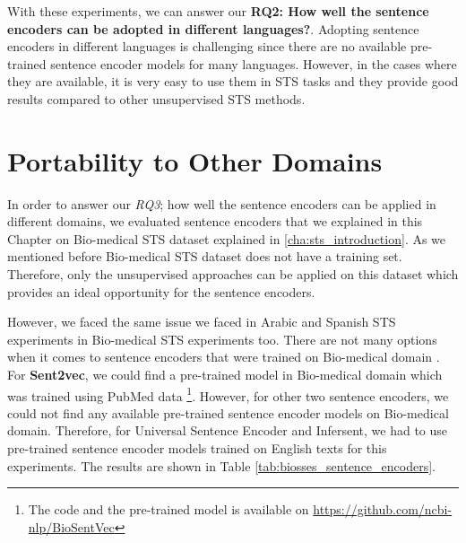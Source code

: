 With these experiments, we can answer our \textbf{RQ2: How well the sentence encoders can be adopted in different languages?}. Adopting sentence encoders in different languages is challenging since there are no available pre-trained sentence encoder models for many languages. However, in the cases where they are available, it is very easy to use them in STS tasks and they provide good results compared to other unsupervised STS methods. 



\section{Portability to Other Domains}

In order to answer our \textit{RQ3}; how well the sentence encoders can be applied in different domains, we evaluated sentence encoders that we explained in this Chapter on Bio-medical STS dataset explained in \ref{cha:sts_introduction}. As we mentioned before Bio-medical STS dataset does not have a training set. Therefore, only the unsupervised approaches can be applied on this dataset which provides an ideal opportunity for the sentence encoders. 

However, we faced the same issue we faced in Arabic and Spanish STS experiments in Bio-medical STS experiments too. There are not many options when it comes to sentence encoders that were trained on Bio-medical domain \cite{TAWFIK2020103396}. For \textbf{Sent2vec}, we could find a pre-trained model in Bio-medical domain which was trained using PubMed data \cite{8904728}\footnote{The code and the pre-trained model is available on \url{https://github.com/ncbi-nlp/BioSentVec}}. However, for other two sentence encoders, we could not find any available pre-trained sentence encoder models on Bio-medical domain. Therefore, for Universal Sentence Encoder and Infersent, we had to use pre-trained sentence encoder models trained on English texts for this experiments. The results are shown in Table \ref{tab:biosses_sentence_encoders}.

